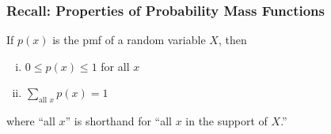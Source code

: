\documentclass[handout]{beamer}
\begin{document}
%
%
%
%
%
\begin{frame}
\frametitle{Recall: Properties of Probability Mass Functions}

If $p(x)$ is the pmf of a random variable $X$, then
\begin{enumerate}[(i)]
	\item $0\leq p(x) \leq 1$ for all $x$ \vspace{1em}
	\item $\displaystyle \sum_{\mbox{all } x} p(x) = 1$
\end{enumerate}

\vspace{0.75em}
where ``all $x$'' is shorthand for ``all $x$ in the support of $X$.''

\end{frame}
\end{document}
